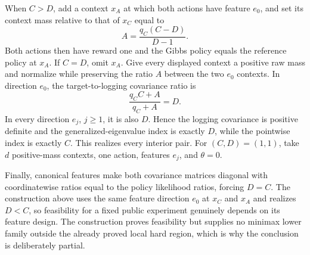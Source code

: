 When \(C>D\), add a context \(x_A\) at which both actions have feature \(e_0\), and set its context mass relative to that of \(x_C\) equal to
\[
A=\frac{q_C(C-D)}{D-1}.
\]
Both actions then have reward one and the Gibbs policy equals the reference policy at \(x_A\). If \(C=D\), omit \(x_A\). Give every displayed context a positive raw mass and normalize while preserving the ratio \(A\) between the two \(e_0\) contexts. In direction \(e_0\), the target-to-logging covariance ratio is
\[
\frac{q_CC+A}{q_C+A}=D.
\]
In every direction \(e_j\), \(j\ge1\), it is also \(D\). Hence the logging covariance is positive definite and the generalized-eigenvalue index is exactly \(D\), while the pointwise index is exactly \(C\). This realizes every interior pair. For \((C,D)=(1,1)\), take \(d\) positive-mass contexts, one action, features \(e_j\), and \(\theta=0\).

Finally, canonical features make both covariance matrices diagonal with coordinatewise ratios equal to the policy likelihood ratios, forcing \(D=C\). The construction above uses the same feature direction \(e_0\) at \(x_C\) and \(x_A\) and realizes \(D<C\), so feasibility for a fixed public experiment genuinely depends on its feature design. The construction proves feasibility but supplies no minimax lower family outside the already proved local hard region, which is why the conclusion is deliberately partial.